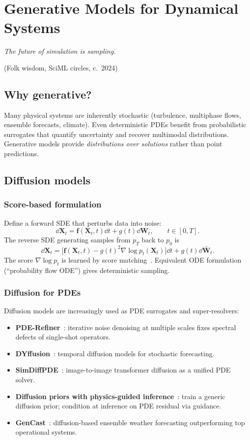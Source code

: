 \chapter{Generative Models for Dynamical Systems}
\label{ch:generative}

\epigraph{\itshape The future of simulation is sampling.}{(Folk wisdom,
SciML circles, c.\ 2024)}

\section{Why generative?}
Many physical systems are inherently stochastic (turbulence,
multiphase flows, ensemble forecasts, climate). Even deterministic
PDEs benefit from probabilistic surrogates that quantify uncertainty
and recover multimodal distributions. Generative models provide
\emph{distributions over solutions} rather than point predictions.

\section{Diffusion models}
\subsection{Score-based formulation}
Define a forward SDE that perturbs data into noise:
\begin{equation}
\dd \bm{X}_t = \bm{f}(\bm{X}_t,t)\dd t + g(t)\dd \bm{W}_t,
\qquad t\in[0,T].
\end{equation}
The reverse SDE generating samples from $p_T$ back to $p_0$ is
\begin{equation}
\dd \bm{X}_t = \big[\bm{f}(\bm{X}_t,t) - g(t)^2\nabla\log p_t(\bm{X}_t)\big]\dd t + g(t)\dd \bar{\bm{W}}_t.
\end{equation}
The score $\nabla\log p_t$ is learned by score
matching~\cite{song2021scoresde}. Equivalent ODE formulation
(``probability flow ODE'') gives deterministic sampling.

\subsection{Diffusion for PDEs}
Diffusion models are increasingly used as PDE surrogates and
super-resolvers:
\begin{itemize}
\item \textbf{PDE-Refiner}~\cite{lippe2023pderefiner}: iterative noise
denoising at multiple scales fixes spectral defects of single-shot
operators.
\item \textbf{DYffusion}~\cite{cachay2023dyffusion}: temporal diffusion
models for stochastic forecasting.
\item \textbf{SimDiffPDE}~\cite{simdiffpde2025}: image-to-image
transformer diffusion as a unified PDE solver.
\item \textbf{Diffusion priors with physics-guided
inference}~\cite{diffphys2026}: train a generic diffusion prior; condition
at inference on PDE residual via guidance.
\item \textbf{GenCast}~\cite{price2024gencast}: diffusion-based ensemble
weather forecasting outperforming top operational systems.
\end{itemize}

